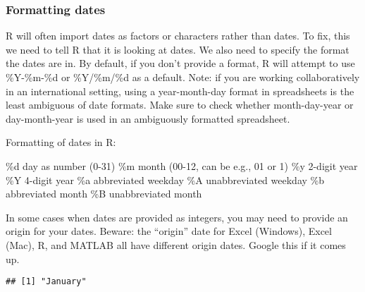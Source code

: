 \documentclass[]{article}
\newenvironment{Shaded}{\begin{snugshade}}{\end{snugshade}}
\newcommand{\CommentTok}[1]{\textcolor[rgb]{0.56,0.35,0.01}{\textit{#1}}}
\newcommand{\DataTypeTok}[1]{\textcolor[rgb]{0.13,0.29,0.53}{#1}}
\newcommand{\KeywordTok}[1]{\textcolor[rgb]{0.13,0.29,0.53}{\textbf{#1}}}
\newcommand{\NormalTok}[1]{#1}
\newcommand{\StringTok}[1]{\textcolor[rgb]{0.31,0.60,0.02}{#1}}
\begin{document}
\hypertarget{formatting-dates}{%
\subsubsection{Formatting dates}\label{formatting-dates}}

R will often import dates as factors or characters rather than dates. To
fix, this we need to tell R that it is looking at dates. We also need to
specify the format the dates are in. By default, if you don't provide a
format, R will attempt to use \%Y-\%m-\%d or \%Y/\%m/\%d as a default.
Note: if you are working collaboratively in an international setting,
using a year-month-day format in spreadsheets is the least ambiguous of
date formats. Make sure to check whether month-day-year or
day-month-year is used in an ambiguously formatted spreadsheet.

Formatting of dates in R:

\%d day as number (0-31) \%m month (00-12, can be e.g., 01 or 1) \%y
2-digit year \%Y 4-digit year \%a abbreviated weekday \%A unabbreviated
weekday \%b abbreviated month \%B unabbreviated month

In some cases when dates are provided as integers, you may need to
provide an origin for your dates. Beware: the ``origin'' date for Excel
(Windows), Excel (Mac), R, and MATLAB all have different origin dates.
Google this if it comes up.

\begin{Shaded}
\end{Shaded}

\begin{verbatim}
## [1] "January"
\end{verbatim}

\begin{Shaded}
\end{Shaded}
\end{document}
